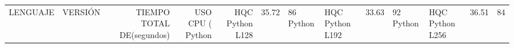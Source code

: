 \begin{tabular}{llrrr}
\toprule
LENGUAJE &         VERSIÓN & TIEMPO TOTAL DE (segundos) & USO CPU (%
\midrule
  Python & HQC Python L128 &                                 35.72 &         86%
  Python & HQC Python L192 &                                 33.63 &         92%
  Python & HQC Python L256 &                                 36.51 &         84%
\bottomrule
\end{tabular}
